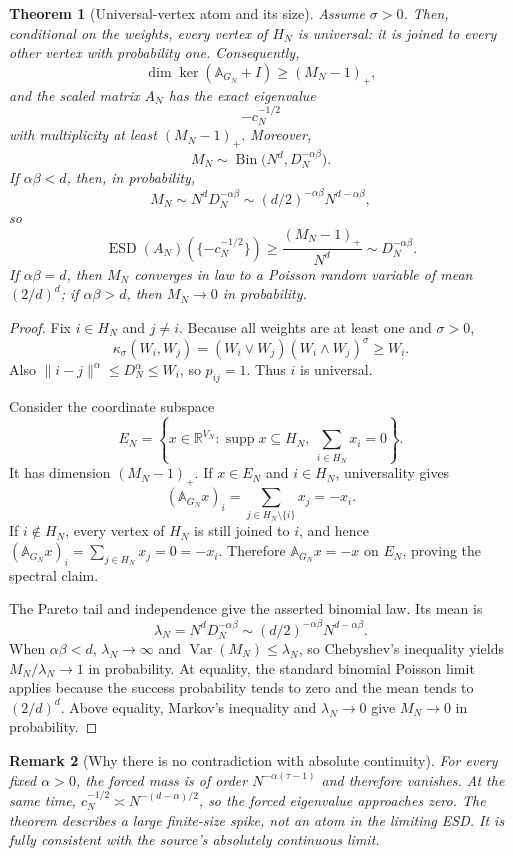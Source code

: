 \documentclass[11pt]{article}
\newtheorem{theorem}{Theorem}
\newtheorem{remark}[theorem]{Remark}
\newcommand{\ESD}{\operatorname{ESD}}
\newcommand{\supp}{\operatorname{supp}}
\begin{document}
\begin{theorem}[Universal-vertex atom and its size]
\label{th:main}
Assume $\sigma>0$.  Then, conditional on the weights, every vertex of $H_N$
is universal: it is joined to every other vertex with probability one.
Consequently,
\[
 \dim\ker(\mathbb A_{G_N}+I)\geq(M_N-1)_+,
\]
and the scaled matrix $A_N$ has the exact eigenvalue
\[
 -c_N^{-1/2}
\]
with multiplicity at least $(M_N-1)_+$.  Moreover,
\[
 M_N\sim\operatorname{Bin}\bigl(N^d,D_N^{-\alpha\beta}\bigr).
\]
If $\alpha\beta<d$, then, in probability,
\[
 M_N\sim N^dD_N^{-\alpha\beta}
 \sim (d/2)^{-\alpha\beta}N^{d-\alpha\beta},
\]
so
\[
 \ESD(A_N)(\{-c_N^{-1/2}\})
 \geq\frac{(M_N-1)_+}{N^d}
 \sim D_N^{-\alpha\beta}.
\]
If $\alpha\beta=d$, then $M_N$ converges in law to a Poisson random variable
of mean $(2/d)^d$; if $\alpha\beta>d$, then $M_N\to0$ in probability.
\end{theorem}

\begin{proof}
Fix $i\in H_N$ and $j\ne i$.  Because all weights are at least one and
$\sigma>0$,
\[
 \kappa_\sigma(W_i,W_j)
 =(W_i\vee W_j)(W_i\wedge W_j)^\sigma
 \geq W_i.
\]
Also $\|i-j\|^\alpha\leq D_N^\alpha\leq W_i$, so $p_{ij}=1$.  Thus $i$ is
universal.

Consider the coordinate subspace
\[
 E_N=\left\{x\in\mathbb R^{V_N}:\supp x\subseteq H_N,
                   \ \sum_{i\in H_N}x_i=0\right\}.
\]
It has dimension $(M_N-1)_+$.  If $x\in E_N$ and $i\in H_N$, universality
gives
\[
 (\mathbb A_{G_N}x)_i
 =\sum_{j\in H_N\setminus\{i\}}x_j=-x_i.
\]
If $i\notin H_N$, every vertex of $H_N$ is still joined to $i$, and hence
$(\mathbb A_{G_N}x)_i=\sum_{j\in H_N}x_j=0=-x_i$.  Therefore
$\mathbb A_{G_N}x=-x$ on $E_N$, proving the spectral claim.

The Pareto tail and independence give the asserted binomial law.  Its mean is
\[
 \lambda_N=N^dD_N^{-\alpha\beta}
 \sim(d/2)^{-\alpha\beta}N^{d-\alpha\beta}.
\]
When $\alpha\beta<d$, $\lambda_N\to\infty$ and
$\operatorname{Var}(M_N)\leq\lambda_N$, so Chebyshev's inequality yields
$M_N/\lambda_N\to1$ in probability.  At equality, the standard binomial
Poisson limit applies because the success probability tends to zero and the
mean tends to $(2/d)^d$.  Above equality, Markov's inequality and
$\lambda_N\to0$ give $M_N\to0$ in probability.
\end{proof}

\begin{remark}[Why there is no contradiction with absolute continuity]
For every fixed $\alpha>0$, the forced mass is of order
$N^{-\alpha(\tau-1)}$ and therefore vanishes.  At the same time,
$c_N^{-1/2}\asymp N^{-(d-\alpha)/2}$, so the forced eigenvalue approaches
zero.  The theorem describes a large finite-size spike, not an atom in the
limiting ESD.  It is fully consistent with the source's absolutely continuous
limit.
\end{remark}
\end{document}
